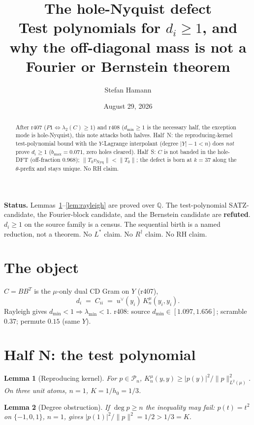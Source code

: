 \documentclass[11pt]{article}
\title{\bfseries The hole-Nyquist defect\\[2mm]
\large Test polynomials for $d_i\ge 1$, and why the
off-diagonal mass is not a Fourier or Bernstein theorem}
\author{Stefan Hamann}
\date{August 29, 2026}
\newtheorem{lemma}{Lemma}
\theoremstyle{remark}
\begin{document}
\maketitle

\begin{abstract}\noindent
After r407 ($P1\iff\lambda_2(C)\ge 1$) and r408
($d_{\min}\ge 1$ is the necessary half, the exception mode
is hole-Nyquist), this note attacks both halves.
Half~N: the reproducing-kernel test-polynomial bound with
the $Y$-Lagrange interpolant (degree $|Y|-1<n$) does
\emph{not} prove $d_i\ge 1$ ($b_{\max}=0.071$, zero holes
cleared).  Half~S: $C$ is not banded in the hole-DFT
(off-fraction $0.968$); $\|T_0 v_{\mathrm{Nyq}}\|<\|T_0\|$;
the defect is born at $k=37$ along the $\theta$-prefix and
stays unique.  No RH claim.
\end{abstract}

\medskip\noindent
\textbf{Status.}\enspace
Lemmas~\ref{lem:rk}--\ref{lem:rayleigh} are proved over
$\mathbb{Q}$.
The test-polynomial SATZ-candidate, the Fourier-block
candidate, and the Bernstein candidate are
\textbf{refuted}.
$d_i\ge 1$ on the source family is a census.
The sequential birth is a named reduction, not a theorem.
No $L^*$ claim.  No $R^\dagger$ claim.  No RH claim.

\section{The object}

$C=BB^T$ is the $\mu$-only dual CD Gram on $Y$ (r407),
\[
  d_i \;=\; C_{ii}
  \;=\; u^\vee(y_i)\,K_n^\mu(y_i,y_i).
\]
Rayleigh gives $d_{\min}<1\Rightarrow\lambda_{\min}<1$.
r408: source $d_{\min}\in[1.097,1.656]$; scramble $0.37$;
permute $0.15$ (same $Y$).

\section{Half N: the test polynomial}

\begin{lemma}[Reproducing kernel]\label{lem:rk}
For $p\in\mathcal{P}_n$,
$K_n^\mu(y,y)\ge |p(y)|^2/\|p\|_{L^2(\mu)}^2$.
On three unit atoms, $n=1$, $K=1/h_0=1/3$.
\end{lemma}

\begin{lemma}[Degree obstruction]\label{lem:deg}
If $\deg p\ge n$ the inequality may fail:
$p(t)=t^2$ on $\{-1,0,1\}$, $n=1$, gives
$|p(1)|^2/\|p\|^2=1/2>1/3=K$.
\end{lemma}
\end{document}
